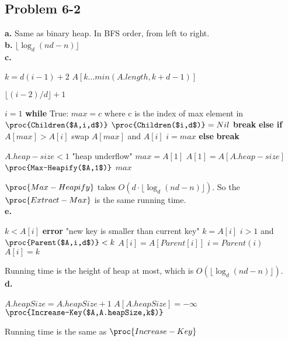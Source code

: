 \documentclass[12pt]{article}
\theoremstyle{definition}
\theoremstyle{remark}
\begin{document}
\subsection*{Problem 6-2}
\textbf{a.} Same as binary heap. In BFS order, from left to right.\\
\textbf{b.} $\lfloor\log_d(nd-n)\rfloor$\\
\textbf{c.}
\begin{codebox}
\li $k=d(i-1)+2$
\li \Return $A[k...min(A.length,k+d-1)]$
\end{codebox}
\begin{codebox}
\li \Return $\lfloor(i-2)/d\rfloor+1$
\end{codebox}
\begin{codebox}
\li $i=1$
\li \textbf{while} True:
\li \quad $max=c$ where c is the index of max element in $\proc{Children($A,i,d$)}$
\li \quad \If $\proc{Children($i,d$)}=Nil$ \textbf{break}
\li \quad \textbf{else if} $A[max]>A[i]$
\li \qquad swap $A[max]$ and $A[i]$
\li \qquad $i=max$
\li \quad \textbf{else} \textbf{break}
\end{codebox}
\begin{codebox}
\li \If $A.heap-size<1$
\li \quad \Return "heap underflow"
\li $max=A[1]$
\li $A[1]=A[A.heap-size]$
\li $\proc{Max-Heapify($A,1$)}$
\li \Return $max$
\end{codebox}
$\proc{Max-Heapify}$ takes $O(d\cdot\lfloor\log_d(nd-n)\rfloor)$. So the $\proc{Extract-Max}$ is the same running time.\\
\textbf{e.}
\begin{codebox}
\li \If $k<A[i]$
\li \quad \textbf{error} "new key is smaller than current key"
\li $k=A[i]$
\li \While $i>1$ and $\proc{Parent($A,i,d$)}<k$
\li \quad $A[i]=A[Parent[i]]$
\li \quad $i=Parent(i)$
\li $A[i]=k$
\end{codebox}
Running time is the height of heap at most, which is $O(\lfloor\log_d(nd-n)\rfloor)$.\\
\textbf{d.}
\begin{codebox}
\li $A.heapSize=A.heapSize+1$
\li $A[A.heapSize]=-\infty$
\li $\proc{Increase-Key($A,A.heapSize,k$)}$
\end{codebox}
Running time is the same as $\proc{Increase-Key}$
\end{document}
